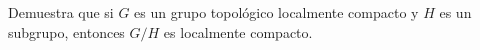 
\item Demuestra que si $G$ es un grupo topológico localmente compacto y $H$ es un subgrupo, entonces $G / H$ es localmente compacto.